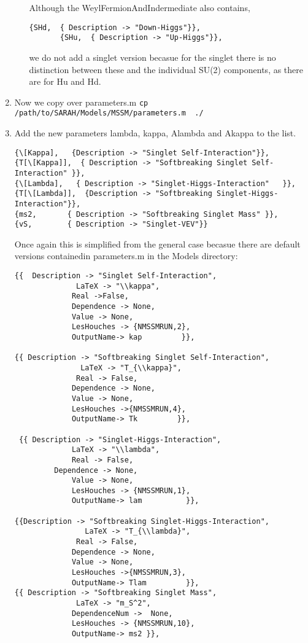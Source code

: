 \documentclass[final,3p,11pt,pdflatex]{elsarticle}
\newcommand{\code}[1]{\lstinline|#1|}  %
\begin{document}
\begin{enumerate}
\begin{enumerate}
Although the WeylFermionAndIndermediate also contains, 
\begin{lstlisting}
{SHd,  { Description -> "Down-Higgs"}},
       {SHu,  { Description -> "Up-Higgs"}},
\end{lstlisting}
\noindent we do not add a singlet version becasue for the singlet there is no distinction between these and the individual SU(2) components, as there are for Hu and Hd.
\end{enumerate} 
\item Now we copy over parameters.m \code{cp /path/to/SARAH/Models/MSSM/parameters.m  ./}
\item Add the new parameters lambda, kappa, Alambda and Akappa to the list.
\begin{lstlisting}
{\[Kappa],   {Description -> "Singlet Self-Interaction"}},              
{T[\[Kappa]],  { Description -> "Softbreaking Singlet Self-Interaction" }}, 
{\[Lambda],   { Description -> "Singlet-Higgs-Interaction"   }},
{T[\[Lambda]],  {Description -> "Softbreaking Singlet-Higgs-Interaction"}}, 
{ms2,       { Description -> "Softbreaking Singlet Mass" }},
{vS,        { Description -> "Singlet-VEV"}}       
\end{lstlisting}
Once again this is simplified from the general case becasue there are default versions containedin parameters.m in the Models directory:
\begin{lstlisting}
{{  Description -> "Singlet Self-Interaction",
              LaTeX -> "\\kappa",
             Real ->False,
             Dependence -> None, 
             Value -> None, 
             LesHouches -> {NMSSMRUN,2},
             OutputName-> kap         }},                               
               
{{ Description -> "Softbreaking Singlet Self-Interaction",
               LaTeX -> "T_{\\kappa}",
              Real -> False,
             Dependence -> None, 
             Value -> None, 
             LesHouches ->{NMSSMRUN,4},
             OutputName-> Tk         }}, 

 {{ Description -> "Singlet-Higgs-Interaction",
             LaTeX -> "\\lambda",
             Real -> False,
	     Dependence -> None, 
             Value -> None, 
             LesHouches -> {NMSSMRUN,1},
             OutputName-> lam          }},                               
               
{{Description -> "Softbreaking Singlet-Higgs-Interaction",
                LaTeX -> "T_{\\lambda}",
              Real -> False,
             Dependence -> None, 
             Value -> None, 
             LesHouches ->{NMSSMRUN,3},
             OutputName-> Tlam         }},    
{{ Description -> "Softbreaking Singlet Mass", 
              LaTeX -> "m_S^2",
             DependenceNum ->  None, 
             LesHouches -> {NMSSMRUN,10},
             OutputName-> ms2 }},
              

\end{lstlisting}
\end{enumerate}
\end{document}
